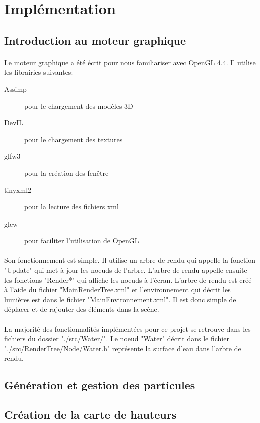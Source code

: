 \documentclass[a4paper, 12pt]{article} %
\begin{document}
\section{Implémentation}
\subsection{Introduction au moteur graphique}
\paragraph{}
Le moteur graphique a été écrit pour nous familiariser avec OpenGL 4.4. Il utilise les librairies suivantes:
\begin{description}
	\item[Assimp] pour le chargement des modèles 3D
	\item[DevIL] pour le chargement des textures
	\item[glfw3] pour la création des fenêtre
	\item[tinyxml2] pour la lecture des fichiers xml
	\item[glew] pour faciliter l'utilisation de OpenGL
\end{description}
\paragraph{}
Son fonctionnement est simple. Il utilise un arbre de rendu qui appelle la fonction "Update" qui met à jour les noeuds de l'arbre.
L'arbre de rendu appelle ensuite les fonctions "Render*" qui affiche les noeuds à l'écran. L'arbre de rendu est créé à l'aide du
fichier "MainRenderTree.xml" et l'environnement qui décrit les lumières est dans le fichier "MainEnvironnement.xml". Il est donc
simple de déplacer et de rajouter des éléments dans la scène.

\paragraph{}
La majorité des fonctionnalités implémentées pour ce projet se retrouve dans les fichiers du dossier "./src/Water/". Le noeud 
"Water" décrit dans le fichier "./src/RenderTree/Node/Water.h" représente la surface d'eau dans l'arbre de rendu.
\subsection{Génération et gestion des particules}
\subsection{Création de la carte de hauteurs}
\end{document}
